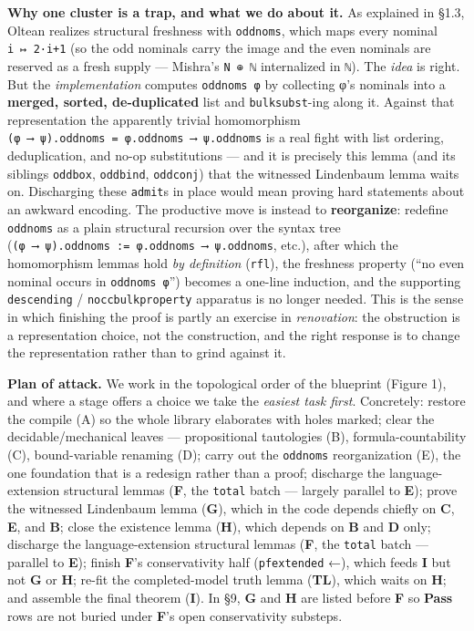 \documentclass[11pt,a4paper]{article}
\renewcommand{\_}{\origtextunderscore\allowbreak}
\begin{document}
\textbf{Why one cluster is a trap, and what we do about it.} As explained in §1.3, Oltean realizes structural freshness with \texttt{odd\_noms}, which maps every nominal \texttt{i\ ↦\ 2·i+1} (so the odd nominals carry the image and the even nominals are reserved as a fresh supply --- Mishra's \texttt{N\ ⊕\ ℕ} internalized in \texttt{ℕ}). The \emph{idea} is right. But the \emph{implementation} computes \texttt{odd\_noms\ φ} by collecting φ's nominals into a \textbf{merged, sorted, de-duplicated} list and \texttt{bulk\_subst}-ing along it. Against that representation the apparently trivial homomorphism \texttt{(φ\ ⟶\ ψ).odd\_noms\ =\ φ.odd\_noms\ ⟶\ ψ.odd\_noms} is a real fight with list ordering, deduplication, and no-op substitutions --- and it is precisely this lemma (and its siblings \texttt{odd\_box}, \texttt{odd\_bind}, \texttt{odd\_conj}) that the witnessed Lindenbaum lemma waits on. Discharging these \texttt{admit}s in place would mean proving hard statements about an awkward encoding. The productive move is instead to \textbf{reorganize}: redefine \texttt{odd\_noms} as a plain structural recursion over the syntax tree (\texttt{(φ\ ⟶\ ψ).odd\_noms\ :=\ φ.odd\_noms\ ⟶\ ψ.odd\_noms}, etc.), after which the homomorphism lemmas hold \emph{by definition} (\texttt{rfl}), the freshness property (``no even nominal occurs in \texttt{odd\_noms\ φ}'') becomes a one-line induction, and the supporting \texttt{descending} / \texttt{nocc\_bulk\_property} apparatus is no longer needed. This is the sense in which finishing the proof is partly an exercise in \emph{renovation}: the obstruction is a representation choice, not the construction, and the right response is to change the representation rather than to grind against it.

\textbf{Plan of attack.} We work in the topological order of the blueprint (Figure 1), and where a stage offers a choice we take the \emph{easiest task first}. Concretely: restore the compile (A) so the whole library elaborates with holes marked; clear the decidable/mechanical leaves --- propositional tautologies (B), formula-countability (C), bound-variable renaming (D); carry out the \texttt{odd\_noms} reorganization (E), the one foundation that is a redesign rather than a proof; discharge the language-extension structural lemmas (\textbf{F}, the \texttt{total\_*} batch --- largely parallel to \textbf{E}); prove the witnessed Lindenbaum lemma (\textbf{G}), which in the code depends chiefly on \textbf{C}, \textbf{E}, and \textbf{B}; close the existence lemma (\textbf{H}), which depends on \textbf{B} and \textbf{D} only; discharge the language-extension structural lemmas (\textbf{F}, the \texttt{total\_*} batch --- parallel to \textbf{E}); finish \textbf{F}'s conservativity half (\texttt{pf\_extended} ←), which feeds \textbf{I} but not \textbf{G} or \textbf{H}; re-fit the completed-model truth lemma (\textbf{TL}), which waits on \textbf{H}; and assemble the final theorem (\textbf{I}). In §9, \textbf{G} and \textbf{H} are listed before \textbf{F} so \textbf{Pass} rows are not buried under \textbf{F}'s open conservativity substeps.
\end{document}

